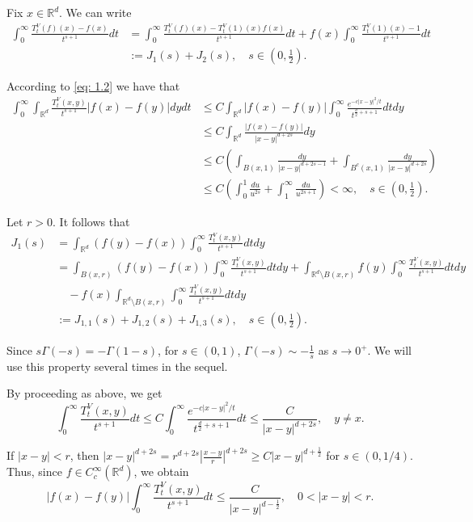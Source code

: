 \documentclass[10pt, a4paper, reqno]{amsart}
\theoremstyle{definition}
\theoremstyle{remark}
\newcommand{\RR}{\mathbb{R}}
\newcommand{\red}[1]{{\color{red!80} #1}}
\numberwithin{equation}{section}
\begin{document}
Fix $x\in \RR^d$. We can write
\begin{align*}
    \int_0^\infty \frac{T_t^V(f)(x)-f(x)}{t^{s+1}}dt&=\int_0^\infty \frac{T_t^V(f)(x)-T_ t^V(1)(x)f(x)}{t^{s+1}}dt+f(x)\int_0^\infty \frac{T_t^V(1)(x)-1}{t^{s+1}}dt\\
    &:=J_1(s)+J_2(s), \quad s\in (0,\tfrac12).
\end{align*}

According to \eqref{eq: 1.2} we have that
\begin{align*}
    \int_0^\infty \int_{\RR^d} \frac{T_t^V(x,y)}{t^{s+1}} |f(x)-f(y)| dy dt &\leq C \int_{\RR^d} |f(x)-f(y)|\int_0^\infty \frac{e^{-c|x-y|^2/t}}{t^{\frac d2 +s+1}}dt dy\\
    &\leq C\int_{\RR^d} \frac{|f(x)-f(y)|}{|x-y|^{d+2s}}dy\\
    &\leq C \left(\int_{B(x,1)} \frac{dy}{|x-y|^{d+2s-1}}+\int_{B^c(x,1)}\frac{dy}{|x-y|^{d+2s}}\right)\\
    &\leq C\left(\int_0^1 \frac{du}{u^{2s}}+\int_1^\infty \frac{du}{u^{2s+1}}\right)<\infty, \quad s\in (0,\tfrac12).
\end{align*}

Let $r>0$. It follows that
\begin{align*}
    J_1(s)&=\int_{\RR^d} (f(y)-f(x))\int_0^\infty \frac{T_t^V(x,y)}{t^{s+1}}dtdy\\
    &=\int_{B(x,r)} (f(y)-f(x))\int_0^\infty \frac{T_t^V(x,y)}{t^{s+1}}dtdy+\int_{\RR^d\setminus B(x,r)} f(y)\int_0^\infty \frac{T_t^V(x,y)}{t^{s+1}}dtdy\\
    &\quad -f(x)\int_{\RR^d\setminus B(x,r)}\int_0^\infty \frac{T_t^V(x,y)}{t^{s+1}}dtdy\\
    &:=J_{1,1}(s)+J_{1,2}(s)+J_{1,3}(s), \quad s\in (0,\tfrac12).
\end{align*}

Since $s\Gamma(-s)=-\Gamma(1-s)$, for $s\in(0,1)$, $\Gamma(-s)\sim -\frac1s$ as $s\to 0^+$. We will use this property several times in the sequel.

By proceeding as above, we get
\[\int_0^\infty \frac{T_t^V(x,y)}{t^{s+1}}dt\leq C \int_0^\infty \frac{e^{-c|x-y|^2/t}}{t^{\frac d2 +s+1}}dt \leq \frac{C}{|x-y|^{d+2s}}, \quad y\neq x.\]

If $|x-y|<r$, then $|x-y|^{d+2s}=r^{d+2s}\left|\frac{x-y}{r}\right|^{d+2s}\geq C|x-y|^{d+\frac12}$ for $s\in (0,1/4)$. %
Thus, since $f\in C_c^\infty(\RR^d)$, we obtain
\[|f(x)-f(y)|\int_0^\infty\frac{T_t^V(x,y)}{t^{s+1}}dt\leq \frac{C}{|x-y|^{d-\frac12}}, \quad 0<|x-y|<r.\]
\end{document}
